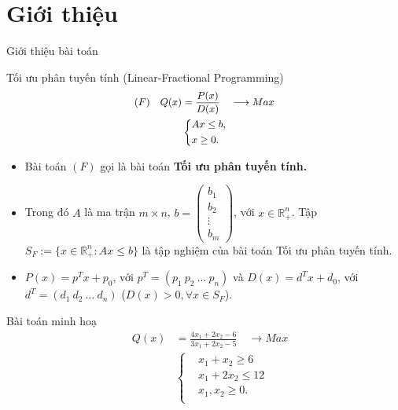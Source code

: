 \documentclass{beamer}
\begin{document}
\section{Giới thiệu}
\begin{frame}
   \center 
   \huge Giới thiệu bài toán 
\end{frame}
\begin{frame}{Tối ưu phân tuyến tính (Linear-Fractional Programming)}
    \begin{equation} \small \label{F}
        \begin{split}
        (F) \quad Q(x) & = \frac{P(x)}{D(x)} \quad \longrightarrow Max \\
            & \left\{
            \begin{split}
            &Ax \leq  b, \\
            &x \geq 0. \\
            \end{split}
            \right.    
        \end{split}
    \end{equation}            
    \begin{itemize} \small
    \item Bài toán $(F)$ gọi là bài toán \textbf{Tối ưu phân tuyến tính.}
    \item Trong đó $A$ là ma trận $m\times n$, $b=\begin{pmatrix}
        b_1 \\
        b_2 \\
        \vdots \\
        b_m
        \end{pmatrix}$, với $x\in \mathbb{R}^n_+$. Tập $S_F:=\{x\in \mathbb{R}^n_+: Ax\leq b\}$ là tập nghiệm của bài toán Tối ưu phân tuyến tính. 
    \item $P(x)=p^Tx+p_0$, với $p^T = (p_1 \: p_2 \: \ldots \: p_n)$ và $D(x)=d^Tx+d_0$, với $d^T = (d_1 \: d_2 \: \ldots \: d_n)$ ($D(x)>0, \forall x \in S_F$).
    \end{itemize}
\end{frame}
\begin{frame}{Bài toán minh hoạ}
    \begin{equation}
    \begin{split}
    \quad Q(x) & = \frac{4x_1+2x_2-6}{3x_1+2x_2-5} \quad \longrightarrow Max \\
        & \left\{
        \begin{split}
        & x_1 + x_2 \geq 6 \\
        & x_1 + 2x_2 \leq 12 \\
        &x_1, x_2 \geq 0. \\
        \end{split}\right.    
    \end{split}
    \end{equation}            
\end{frame}
\end{document}
